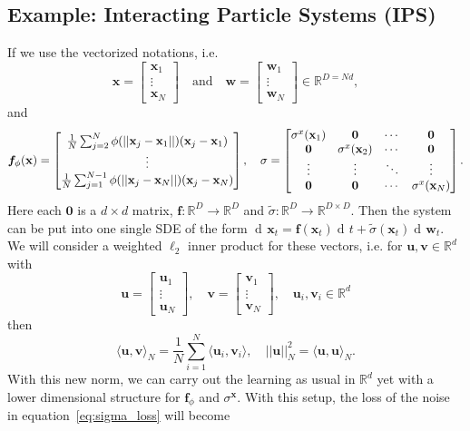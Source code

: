 \documentclass[11pt]{article} %
\def\eqref#1{equation~\ref{#1}}
\def\rx{{\textnormal{x}}}
\def\rvu{{\mathbf{i}}}
\def\rvu{{\mathbf{u}}}
\def\rvv{{\mathbf{v}}}
\def\rvw{{\mathbf{w}}}
\def\rvx{{\mathbf{x}}}
\def\vf{{\bm{f}}}
\def\vx{{\bm{x}}}
\newcommand{\R}{\mathbb{R}}
\DeclareMathOperator{\dif}{d \!}        %
\newcommand{\zero}{\mathbf{0}}
\newcommand{\norm}[1]{||#1||}
\begin{document}
\subsection{Example: Interacting Particle Systems (IPS)}
%
 If we use the vectorized notations, i.e. 
\[
\rvx = \begin{bmatrix} \rvx_1 \\ \vdots \\ \rvx_N\end{bmatrix} \quad \text{and} \quad \rvw = \begin{bmatrix} \rvw_1 \\ \vdots \\ \rvw_N\end{bmatrix} \in \R^{D = Nd},
\]
and  
\[
\vf_{\phi}(\rvx) = \begin{bmatrix} \frac{1}{N}\sum_{j = 2}^N\phi(\norm{\rvx_j - \rvx_1})(\rvx_j - \rvx_1) \\ \vdots \\ \frac{1}{N}\sum_{j = 1}^{N - 1}\phi(\norm{\rvx_j - \rvx_N})(\rvx_j - \rvx_N)\end{bmatrix},  \quad
\sigma = \begin{bmatrix} \sigma^{\rx}(\rvx_1) & \zero & \cdots & \zero \\ \zero & \sigma^{\rx}(\rvx_2) & \cdots & \zero \\ \vdots & \vdots & \ddots & \vdots \\ \zero & \zero & \cdots & \sigma^{\rx}(\rvx_N) \end{bmatrix}. 
\]
Here each $\zero$ is a $d \times d$ matrix, $\vf: \R^D \rightarrow \R^D$ and $\tilde{\sigma}:\R^D \rightarrow \R^{D \times D}$.  Then the system can be put into one single SDE of the form $\dif \rvx_t = \vf(\rvx_t)\dif t + \tilde\sigma(\rvx_t)\dif \rvw_t$.  We will consider a weighted $\ell_2$ inner product for these vectors, i.e. for $\rvu, \rvv \in \R^d$ with
\[
\rvu = \begin{bmatrix} \rvu_1 \\ \vdots \\ \rvu_N\end{bmatrix}, \quad \rvv = \begin{bmatrix} \rvv_1 \\ \vdots \\ \rvv_N\end{bmatrix}, \quad \rvu_i, \rvv_i \in \R^{d}
\]
then
\[
\langle\rvu, \rvv\rangle_N = \frac{1}{N}\sum_{i = 1}^N\langle\rvu_i, \rvv_i\rangle, \quad \norm{\rvu}_N^2 = \langle\rvu, \rvu\rangle_N.
\]
With this new norm, we can carry out the learning as usual in $\R^d$ yet with a lower dimensional structure for $\vf_{\phi}$ and $\sigma^{\vx}$. With this setup, the loss of the noise in \eqref{eq:sigma_loss} will become
\end{document}
